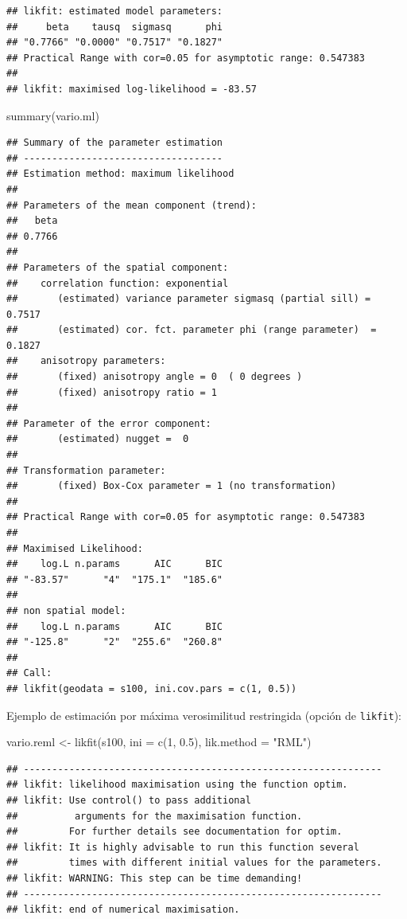 \documentclass[
  spanish,
]{book}
\newenvironment{Shaded}{\begin{snugshade}}{\end{snugshade}}
\newcommand{\AttributeTok}[1]{\textcolor[rgb]{0.77,0.63,0.00}{#1}}
\newcommand{\DecValTok}[1]{\textcolor[rgb]{0.00,0.00,0.81}{#1}}
\newcommand{\FloatTok}[1]{\textcolor[rgb]{0.00,0.00,0.81}{#1}}
\newcommand{\FunctionTok}[1]{\textcolor[rgb]{0.00,0.00,0.00}{#1}}
\newcommand{\NormalTok}[1]{#1}
\newcommand{\OtherTok}[1]{\textcolor[rgb]{0.56,0.35,0.01}{#1}}
\newcommand{\StringTok}[1]{\textcolor[rgb]{0.31,0.60,0.02}{#1}}
\theoremstyle{break}
\theoremstyle{definition}
\theoremstyle{definition}
\theoremstyle{definition}
\theoremstyle{definition}
\theoremstyle{remark}
\begin{document}
\begin{verbatim}
## likfit: estimated model parameters:
##     beta    tausq  sigmasq      phi 
## "0.7766" "0.0000" "0.7517" "0.1827" 
## Practical Range with cor=0.05 for asymptotic range: 0.547383
## 
## likfit: maximised log-likelihood = -83.57
\end{verbatim}

\begin{Shaded}
\begin{Highlighting}[]
\FunctionTok{summary}\NormalTok{(vario.ml)}
\end{Highlighting}
\end{Shaded}

\begin{verbatim}
## Summary of the parameter estimation
## -----------------------------------
## Estimation method: maximum likelihood 
## 
## Parameters of the mean component (trend):
##   beta 
## 0.7766 
## 
## Parameters of the spatial component:
##    correlation function: exponential
##       (estimated) variance parameter sigmasq (partial sill) =  0.7517
##       (estimated) cor. fct. parameter phi (range parameter)  =  0.1827
##    anisotropy parameters:
##       (fixed) anisotropy angle = 0  ( 0 degrees )
##       (fixed) anisotropy ratio = 1
## 
## Parameter of the error component:
##       (estimated) nugget =  0
## 
## Transformation parameter:
##       (fixed) Box-Cox parameter = 1 (no transformation)
## 
## Practical Range with cor=0.05 for asymptotic range: 0.547383
## 
## Maximised Likelihood:
##    log.L n.params      AIC      BIC 
## "-83.57"      "4"  "175.1"  "185.6" 
## 
## non spatial model:
##    log.L n.params      AIC      BIC 
## "-125.8"      "2"  "255.6"  "260.8" 
## 
## Call:
## likfit(geodata = s100, ini.cov.pars = c(1, 0.5))
\end{verbatim}

Ejemplo de estimación por máxima verosimilitud restringida (opción de
\texttt{likfit}):

\begin{Shaded}
\begin{Highlighting}[]
\NormalTok{vario.reml }\OtherTok{\textless{}{-}} \FunctionTok{likfit}\NormalTok{(s100, }\AttributeTok{ini =} \FunctionTok{c}\NormalTok{(}\DecValTok{1}\NormalTok{, }\FloatTok{0.5}\NormalTok{), }\AttributeTok{lik.method =} \StringTok{"RML"}\NormalTok{)}
\end{Highlighting}
\end{Shaded}

\begin{verbatim}
## ---------------------------------------------------------------
## likfit: likelihood maximisation using the function optim.
## likfit: Use control() to pass additional
##          arguments for the maximisation function.
##         For further details see documentation for optim.
## likfit: It is highly advisable to run this function several
##         times with different initial values for the parameters.
## likfit: WARNING: This step can be time demanding!
## ---------------------------------------------------------------
## likfit: end of numerical maximisation.
\end{verbatim}
\end{document}

